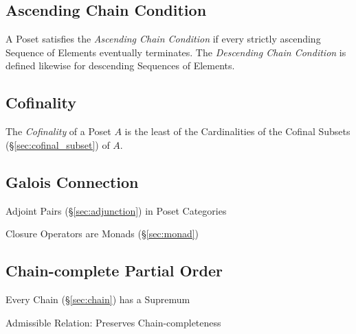 \subsection{Ascending Chain Condition}\label{sec:ascending_chain}

A Poset satisfies the \emph{Ascending Chain Condition} if every
strictly ascending Sequence of Elements eventually terminates. The
\emph{Descending Chain Condition} is defined likewise for descending
Sequences of Elements.



\subsection{Cofinality}\label{sec:cofinality}

The \emph{Cofinality} of a Poset $A$ is the least of the Cardinalities
of the Cofinal Subsets (\S\ref{sec:cofinal_subset}) of $A$.



\subsection{Galois Connection}\label{sec:galois_connection}

Adjoint Pairs (\S\ref{sec:adjunction}) in Poset Categories

Closure Operators are Monads (\S\ref{sec:monad})



\subsection{Chain-complete Partial Order}\label{sec:cpo}

Every Chain (\S\ref{sec:chain}) has a Supremum

Admissible Relation: Preserves Chain-completeness



